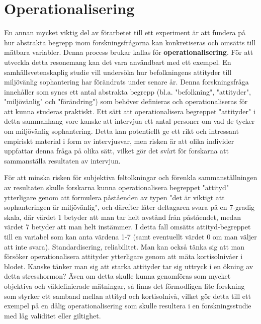 \documentclass[
]{book}
\begin{document}
\hypertarget{sec06.2}{%
\section{Operationalisering}\label{sec06.2}}

En annan mycket viktig del av förarbetet till ett experiment är att fundera på hur abstrakta begrepp inom forskningsfrågorna kan konkretiseras och omsätts till mätbara variabler. Denna process brukar kallas för \textbf{operationalisering}. För att utveckla detta resonemang kan det vara användbart med ett exempel. En samhällsvetenskaplig studie vill undersöka hur befolkningens attityder till miljövänlig sophantering har förändrats under senare år. Denna forskningsfråga innehåller som synes ett antal abstrakta begrepp (bl.a. "befolkning", "attityder", "miljövänlig" och "förändring") som behöver definieras och operationaliseras för att kunna studeras praktiskt. Ett sätt att operationalisera begreppet "attityder" i detta sammanhang vore kanske att intervjua ett antal personer om vad de tycker om miljövänlig sophantering. Detta kan potentiellt ge ett rikt och intressant empiriskt material i form av intervjusvar, men risken är att olika individer uppfattar denna fråga på olika sätt, vilket gör det svårt för forskarna att sammanställa resultaten av intervjun.

För att minska risken för subjektiva feltolkningar och förenkla sammanställningen av resultaten skulle forskarna kunna operationalisera begreppet "attityd" ytterligare genom att formulera påståenden av typen "det är viktigt att sophanteringen är miljövänlig", och därefter låter deltagaren svara på en 7-gradig skala, där värdet 1 betyder att man tar helt avstånd från påståendet, medan värdet 7 betyder att man helt instämmer. I detta fall omsätts attityd-begreppet till en variabel som kan anta värdena 1-7 (samt eventuellt värdet 0 om man väljer att inte svara). Standardisering, reliabilitet. Man kan också tänka sig att man försöker operationalisera attityder ytterligare genom att mäta kortisolnivåer i blodet. Kanske tänker man sig att starka attityder tar sig uttryck i en ökning av detta stresshormon? Även om detta skulle kunna genomföras som mycket objektiva och väldefinierade mätningar, så finns det förmodligen lite forskning som styrker ett samband mellan attityd och kortisolnivå, vilket gör detta till ett exempel på en dålig operationalisering som skulle resultera i en forskningsstudie med låg validitet eller giltighet.
\end{document}
